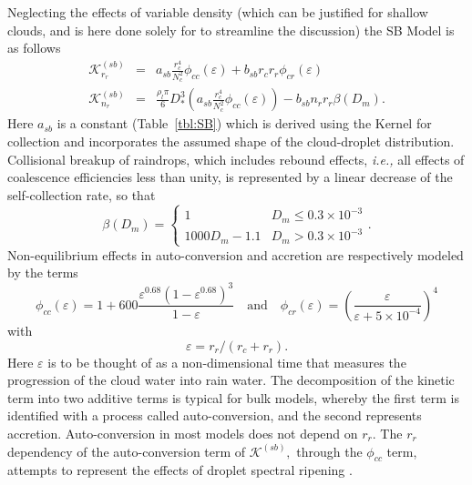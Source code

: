 \documentclass[11pt,a4paper]{article}
\begin{document}
Neglecting the effects of variable density (which can be justified for
shallow clouds, and is here done solely for to streamline the
discussion) the SB Model is as follows
\begin{eqnarray}
\mathcal{K}_{r_r}^{(sb)} & = & a_{sb} \frac{r_c^4}{N_c^2}
\phi_{cc}(\varepsilon) + b_{sb} r_cr_r
\phi_{cr}(\varepsilon)\label{eq:sb1} \\ \mathcal{K}_{n_r}^{(sb)} & = &
\frac{\rho_l \pi}{6} D_*^3\left(a_{sb} \frac{r_c^4}{N_c^2}
\phi_{cc}(\varepsilon) \right) - b_{sb} n_r r_r \beta(D_m). \label{eq:sbn}
\end{eqnarray}
Here $a_{sb}$ is a constant (Table~\ref{tbl:SB}) which is derived
using the \cite{Long:1974} Kernel for collection and incorporates the
assumed shape of the cloud-droplet distribution.  Collisional breakup
of raindrops, which includes rebound effects, \emph{i.e.,} all effects
of coalescence efficiencies less than unity, is represented by a
linear decrease of the self-collection rate, so that
\begin{equation}
\beta({D_m}) = \begin{cases} 1 & D_m \le 0.3 \times 10^{-3} \\
  1000D_m- 1.1 & D_m > 0.3  \times 10^{-3}\end{cases} .
\end{equation}
Non-equilibrium effects in auto-conversion and accretion are
respectively modeled by the terms
\begin{equation}
\phi_{cc}(\varepsilon) = 1 + 600 \frac{\varepsilon^{0.68} (
1-\varepsilon^{0.68})^3}{1-\varepsilon} \quad \text{and} \quad
\phi_{cr}(\varepsilon) = \left(\frac{\varepsilon}{\varepsilon + 5
\times 10^{-4}}\right)^4 \label{eq:phis}
\end{equation}
with 
\begin{equation}
\varepsilon = r_r/(r_c+r_r) \label{eq:epsilon}.
\end{equation}
Here $\varepsilon$ is to be thought of as a non-dimensional time that
measures the progression of the cloud water into rain water.  The
decomposition of the kinetic term into two additive terms is typical
for bulk models, whereby the first term is identified with a process
called auto-conversion, and the second represents accretion.
Auto-conversion in most models does not depend on $r_r.$ The $r_r$
dependency of the auto-conversion term of $\mathcal{K}^{(sb)},$
through the $\phi_{cc}$ term, attempts to represent the effects of
droplet spectral ripening \cite[]{Cotto:1972,Lupke:1989}.
\end{document}

